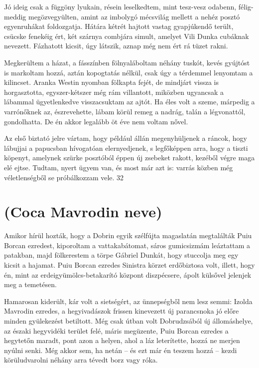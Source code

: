 \documentclass{IEEEtran}
\begin{document}
Jó ideig csak a függöny lyukain, résein leselkedtem, mint tesz-vesz odabenn,
félig-meddig megözvegyülten, amint az imbolygó mécsvilág mellett a nehéz
posztó egyenruhákat foldozgatja. Hátára kétrét hajtott vastag gyapjúkendő
terült, csücske fenekéig ért, két szárnya combjára simult, amelyet Vili Dunka
cubáknak nevezett. Fázhatott kicsit, úgy látszik, aznap még nem ért rá tüzet
rakni.

Megkerültem a házat, a fásszínben fölnyaláboltam néhány tuskót, kevés gyújtóst
is markoltam hozzá, aztán kopogtatás nélkül, csak úgy a térdemmel lenyomtam a
kilincset. Aranka Westin nyomban fölkapta fejét, de mindjárt vissza is
horgasztotta, egyszer-kétszer még rám villantott, miközben ugyancsak a
lábammal ügyetlenkedve visszacsuktam az ajtót. Ha éles volt a szeme, márpedig
a varrónőknek az, észrevehette, lábam körül remeg a nadrág, talán a
légvonattól, gondolhatta. De én akkor legalább öt éve nem voltam nővel.

Az első biztató jelre vártam, hogy például állán megenyhüljenek a ráncok, hogy
lábujjai a papucsban hívogatóan elernyedjenek, s legfőképpen arra, hogy a
tiszti köpenyt, amelynek szürke posztóból éppen új zsebeket rakott, kezéből
végre maga elé ejtse. Tudtam, nyert ügyem van, és most már azt is: varrás
közben még véletlenségből se próbálkozzam vele.
32
\section{(Coca Mavrodin neve)}

Amikor hírül hozták, hogy a Dobrin egyik szélfújta magaslatán megtalálták Puiu
Borcan ezredest, kiporoltam a vattakabátomat, sáros gumicsizmám leáztattam a
patakban, majd fölkerestem a törpe Gábriel Dunkát, hogy stuccolja meg egy
kicsit a hajamat. Puiu Borcan ezredes Sinistra körzet erdőbiztosa volt,
illett, hogy én, mint az erdeigyümölcs-betakarító központ diszpécsere, ápolt
külsővel jelenjek meg a temetésen.

Hamarosan kiderült, kár volt a sietségért, az ünnepségből nem lesz semmi:
Izolda Mavrodin ezredes, a hegyivadászok frissen kinevezett új parancsnoka jó
előre minden gyülekezést betiltott. Még csak útban volt Dobrudzsából új
állomáshelye, az északi hegyvidéki terület felé, máris megüzente, Puiu Borcan
ezredes a hegytetőn maradt, pont azon a helyen, ahol a láz leterítette, hozzá
ne merjen nyúlni senki. Még akkor sem, ha netán – és ezt már én teszem hozzá –
kezdi körüludvarolni néhány arra tévedt borz vagy róka.
\end{document}
